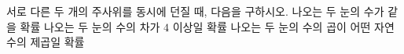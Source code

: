 서로 다른 두 개의 주사위를 동시에 던질 때, 다음을 구하시오.
 나오는 두 눈의 수가 같을 확률
 나오는 두 눈의 수의 차가 $4$ 이상일 확률
 나오는 두 눈의 수의 곱이 어떤 자연수의 제곱일 확률
